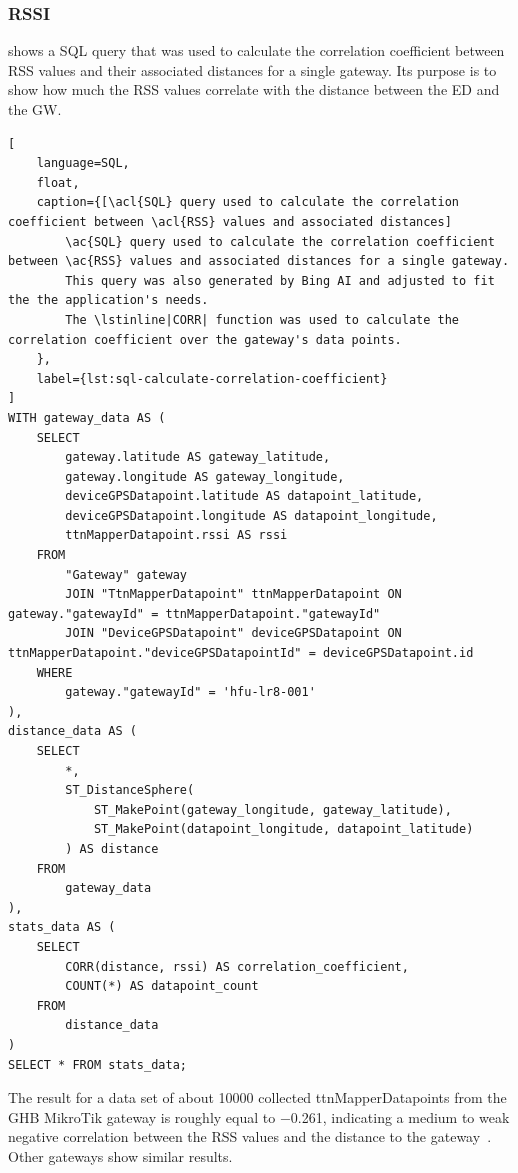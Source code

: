 \subsubsection{\acl{RSSI}}

 shows a \ac{SQL} query that was used to calculate the correlation coefficient between \ac{RSS} values and their associated distances for a single gateway.
Its purpose is to show how much the \ac{RSS} values correlate with the distance between the \acl{ED} and the \ac{GW}.

\begin{lstlisting}[
    language=SQL,
    float,
    caption={[\acl{SQL} query used to calculate the correlation coefficient between \acl{RSS} values and associated distances]
        \ac{SQL} query used to calculate the correlation coefficient between \ac{RSS} values and associated distances for a single gateway.
        This query was also generated by Bing AI and adjusted to fit the the application's needs.
        The \lstinline|CORR| function was used to calculate the correlation coefficient over the gateway's data points.
    },
    label={lst:sql-calculate-correlation-coefficient}
]
WITH gateway_data AS (
    SELECT
        gateway.latitude AS gateway_latitude,
        gateway.longitude AS gateway_longitude,
        deviceGPSDatapoint.latitude AS datapoint_latitude,
        deviceGPSDatapoint.longitude AS datapoint_longitude,
        ttnMapperDatapoint.rssi AS rssi
    FROM
        "Gateway" gateway
        JOIN "TtnMapperDatapoint" ttnMapperDatapoint ON gateway."gatewayId" = ttnMapperDatapoint."gatewayId"
        JOIN "DeviceGPSDatapoint" deviceGPSDatapoint ON ttnMapperDatapoint."deviceGPSDatapointId" = deviceGPSDatapoint.id
    WHERE
        gateway."gatewayId" = 'hfu-lr8-001'
),
distance_data AS (
    SELECT
        *,
        ST_DistanceSphere(
            ST_MakePoint(gateway_longitude, gateway_latitude),
            ST_MakePoint(datapoint_longitude, datapoint_latitude)
        ) AS distance
    FROM
        gateway_data
),
stats_data AS (
    SELECT
        CORR(distance, rssi) AS correlation_coefficient,
		COUNT(*) AS datapoint_count
    FROM
        distance_data
)
SELECT * FROM stats_data;
\end{lstlisting}

The result for a data set of about \num{10000} collected ttnMapperDatapoints from the \ac{GHB} MikroTik gateway is roughly equal to \num{-0.261}, indicating a medium to weak negative correlation between the \ac{RSS} values and the distance to the gateway~\cite{taylor_interpretation_1990}.
Other gateways show similar results.


